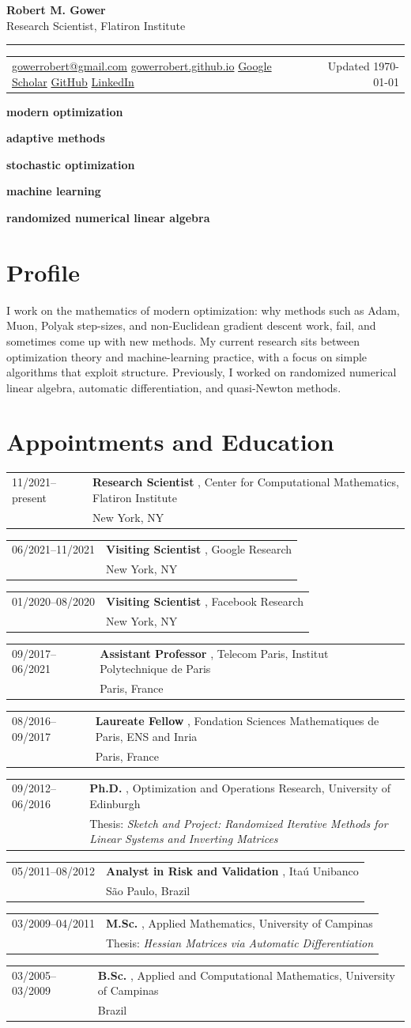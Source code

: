 \documentclass[10pt,letterpaper]{article}
\makeatletter
\newcommand{\cvtag}[1]{%
  \begingroup
  \setlength{\fboxsep}{3pt}%
  \colorbox{soft}{\textcolor{accent}{\footnotesize\bfseries #1}}%
  \endgroup
}
\newcommand{\entry}[4]{%
  \begin{tabularx}{\textwidth}{@{}p{0.19\textwidth}X@{}}
    \textcolor{muted}{#1} & \textbf{#2} #3\\
    & {\small\textcolor{muted}{#4}}
  \end{tabularx}\vspace{0.35em}
}
\makeatother
\begin{document}
{\Huge\bfseries Robert M. Gower}\\[0.4em]
{\Large\color{muted}Research Scientist, Flatiron Institute}\\[0.65em]
{\color{rule}\hrule}
\vspace{0.7em}

\begin{tabularx}{\textwidth}{@{}Xr@{}}
\href{mailto:gowerrobert@gmail.com}{gowerrobert@gmail.com} \quad
\href{https://gowerrobert.github.io}{gowerrobert.github.io} \quad
\href{https://scholar.google.com/citations?user=okKw87MAAAAJ\&hl=en}{Google Scholar} \quad
\href{https://github.com/gowerrobert}{GitHub} \quad
\href{https://www.linkedin.com/in/robert-mansel-gower-a27bba23}{LinkedIn}
&
Updated \today
\end{tabularx}

\vspace{0.8em}
\cvtag{modern optimization}
\cvtag{adaptive methods}
\cvtag{stochastic optimization}
\cvtag{machine learning}
\cvtag{randomized numerical linear algebra}

\section{Profile}
I work on the mathematics of modern optimization: why methods such as Adam, Muon, Polyak step-sizes, and non-Euclidean gradient descent work, fail, and sometimes come up with new methods. My current research sits between optimization theory and machine-learning practice, with a focus on simple algorithms that exploit structure. Previously, I worked on randomized numerical linear algebra, automatic differentiation, and quasi-Newton methods.

\section{Appointments and Education}
\entry{11/2021--present}{Research Scientist}{, Center for Computational Mathematics, Flatiron Institute}{New York, NY}
\entry{06/2021--11/2021}{Visiting Scientist}{, Google Research}{New York, NY}
\entry{01/2020--08/2020}{Visiting Scientist}{, Facebook Research}{New York, NY}
\entry{09/2017--06/2021}{Assistant Professor}{, Telecom Paris, Institut Polytechnique de Paris}{Paris, France}
\entry{08/2016--09/2017}{Laureate Fellow}{, Fondation Sciences Mathematiques de Paris, ENS and Inria}{Paris, France}
\entry{09/2012--06/2016}{Ph.D.}{, Optimization and Operations Research, University of Edinburgh}{Thesis: \emph{Sketch and Project: Randomized Iterative Methods for Linear Systems and Inverting Matrices}}
\entry{05/2011--08/2012}{Analyst in Risk and Validation}{, Ita\'u Unibanco}{S\~ao Paulo, Brazil}
\entry{03/2009--04/2011}{M.Sc.}{, Applied Mathematics, University of Campinas}{Thesis: \emph{Hessian Matrices via Automatic Differentiation}}
\entry{03/2005--03/2009}{B.Sc.}{, Applied and Computational Mathematics, University of Campinas}{Brazil}
\end{document}
